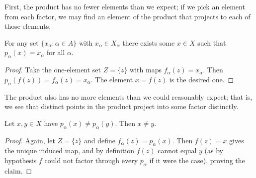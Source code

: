       First, the product has no fewer elements than we expect; if we pick an element from each factor, we may find an element of the product that projects to each of those elements.
      \begin{claim}
        For any set $\{x_\alpha:\alpha\in A\}$ with $x_\alpha\in X_\alpha$ there exists some $x\in X$ such that $p_\alpha(x)=x_\alpha$ for all $\alpha$.
        \begin{proof}
          Take the one-element set $Z=\{z\}$ with maps $f_\alpha(z)=x_\alpha$.
          Then $p_\alpha(f(z))=f_\alpha(z)=x_\alpha$.
          The element $x=f(z)$ is the desired one.
        \end{proof}
      \end{claim}
      
      The product also has no more elements than we could reasonably expect; that is, we see that distinct points in the product project into some factor distinctly. 
      \begin{claim}
        Let $x,y\in X$ have $p_\alpha(x)\ne p_\alpha(y)$.
        Then $x\ne y$.
        \begin{proof}
          Again, let $Z=\{z\}$ and define $f_\alpha(z)=p_\alpha(x)$.
          Then $f(z)=x$ gives the unique induced map, and by definition $f(z)$ cannot equal $y$ (as by hypothesis $f$ could not factor through every $p_\alpha$ if it were the case), proving the claim.
        \end{proof}
      \end{claim}

